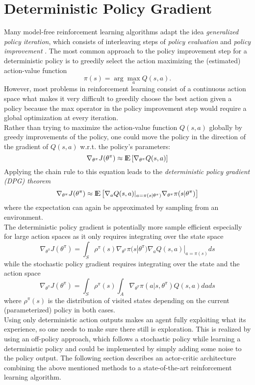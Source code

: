 \section{Deterministic Policy Gradient}
\label{sec:DPG}
Many model-free reinforcement learning algorithms adapt the idea \textit{generalized policy iteration}, which consists of interleaving steps of \textit{policy evaluation} and \textit{policy improvement} \citep{sutton2018reinforcement}. The most common approach to the policy improvement step for a deterministic policy is to greedily select the action maximizing the (estimated) action-value function
\[
\pi(s) = \arg\max_a Q(s, a).
\]
However, most problems in reinforcement learning consist of a continuous action space what makes it very difficult to greedily choose the best action given a policy because the max operator in the policy improvement step would require a global optimization at every iteration.\\ 
Rather than trying to maximize the action-value function $Q(s,a)$ globally by greedy improvements of the policy, one could move the policy in the direction of the gradient of $Q(s,a)$ w.r.t. the policy's parameters:
\[
\nabla_{\theta^\pi}J(\theta^\pi)\approx {\rm I\!E}\left[\nabla_{\theta^\pi}Q(s,a)\right]
\]
Applying the chain rule to this equation leads to the \textit{deterministic policy gradient (DPG) theorem}
\begin{align*}
\nabla_{\theta^\pi}J(\theta^\pi)\approx {\rm I\!E}\left[\nabla_aQ(s,a)|_{a=\pi(s|\theta^\pi)} \nabla_{\theta^\pi}\pi(s|\theta^\pi)\right]
\end{align*}
where the expectation can again be approximated by sampling from an environment.\\
The deterministic policy gradient is potentially more sample efficient especially for large action spaces as it only requires integrating over the state space
\[
\nabla_{\theta^\pi}J(\theta^\pi) = \int_{\mathit{S}}\rho^\pi(s) \nabla_{\theta^\pi}\pi(s|\theta^\pi)\nabla_a Q(s,a)|_{a=\pi(s)} ds
\]
while the stochastic policy gradient \citep{sutton2018reinforcement} requires integrating over the state and the action space
\[
\nabla_{\theta^\pi}J(\theta^\pi)=\int_{\mathit{S}}\rho^\pi(s)\int_{\mathit{A}}\nabla_{\theta^\pi}\pi(a|s,\theta^\pi)Q(s, a) da ds
\]
where $\rho^\pi(s)$ is the distribution of visited states depending on the current (parameterized) policy in both cases.\\
Using only deterministic action outputs makes an agent fully exploiting what its experience, so one needs to make sure there still is exploration. This is realized by using an off-policy approach, which follows a stochastic policy while learning a deterministic policy and could be implemented by simply adding some noise to the policy output. The following section describes an actor-critic architecture combining the above mentioned methods to a state-of-the-art reinforcement learning algorithm.


